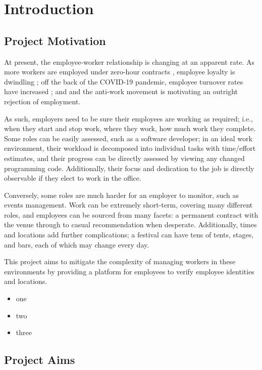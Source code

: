 \chapter{Introduction}

\section{Project Motivation}

At present, the employee-worker relationship is changing at
an apparent rate.
As more workers are employed under zero-hour contracts
\parencite{zeroHourContractsStats}, employee loyalty is
dwindling \parencite{zeroHourContractsLoyalty}; off the
back of the COVID-19 pandemic, employee turnover rates have
increased \parencite{employeeTurnover}; and and the
anti-work movement is motivating an outright rejection of
employment\nocite{antiWorkMovement}.

As such, employers need to be sure their employees are
working as required; i.e., when they start and stop work,
where they work, how much work they complete.
Some roles can be easily assessed, such as a software
developer; in an ideal work environment, their workload is
decomposed into individual tasks with time/effort
estimates, and their progress can be directly assessed by
viewing any changed programming code.
Additionally, their focus and dedication to the job is
directly observable if they elect to work in the office.

Conversely, some roles are much harder for an employer to
monitor, such as events management.
Work can be extremely short-term, covering many different
roles, and employees can be sourced from many facets: a
permanent contract with the venue through to casual
recommendation when desperate.
Additionally, times and locations add further
complications; a festival can have tens of tents, stages,
and bars, each of which may change every day.

This project aims to mitigate the complexity of managing
workers in these environments by providing a platform for
employees to verify employee identities and locations.

\begin{itemize}
  \item one
  \item two
  \item three
\end{itemize}

\section{Project Aims}

